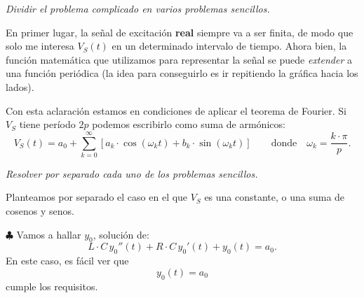 \begin{enumerate}[{\bfseries [1]}]
  \item\textit{\color{blue} Dividir el problema complicado en varios problemas sencillos.}

    En primer lugar, la señal de excitación \textbf{real} siempre va a ser finita, de modo que solo me interesa $V_S(t)$ en un determinado intervalo de tiempo. Ahora bien, la función matemática que utilizamos para representar la señal se puede \textit{extender} a una función periódica (la idea para conseguirlo es ir repitiendo la gráfica hacia los lados).

Con esta aclaración estamos en condiciones de aplicar el teorema de Fourier. Si $V_S$ tiene período $2p$ podemos escribirlo como suma de armónicos:
\[
V_S(t) = a_0 + \sum_{k=0}^{\infty} [a_k \cdot \cos(\omega_kt) + b_k \cdot \sin(\omega_kt)]\qquad \text{donde}\quad \omega_k=\frac{k\cdot \pi}{p}.
\]
  \item \textit{\color{blue}Resolver por separado cada uno de los problemas sencillos.}

Planteamos por separado el caso en el que $V_S$ es una constante, o una suma de cosenos y senos.

 $\clubsuit$ Vamos a hallar $y_0$, solución de:
\[
L\cdot C \,y_0 '' (t) + R\cdot C\, y_0'(t) + y_0(t) = a_0.
\]
En este caso, es fácil ver que
\[\boxed{
y_0(t) = a_0
}\]
cumple los requisitos.


\end{enumerate}
